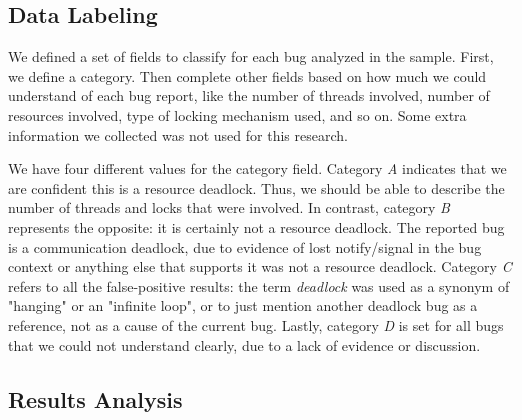 \subsection{Data Labeling}

We defined a set of fields to classify for each bug analyzed in the sample. First, we define a category. Then complete other fields based on how much we could understand of each bug report, like the number of threads involved, number of resources involved, type of locking mechanism used, and so on. Some extra information we collected was not used for this research.

We have four different values for the category field.
Category \emph{A} indicates that  we are confident this is a resource deadlock. Thus, we should be able to describe the number of threads and locks that were involved.
In contrast, category \emph{B} represents the opposite: it is certainly not a resource deadlock. The reported bug is a communication deadlock, due to evidence of lost notify/signal in the bug context or anything else that supports it was not a resource deadlock.
Category \emph{C} refers to all the false-positive results: the term \emph{deadlock} was used as a synonym of "hanging" or an "infinite loop", or to just mention another deadlock bug as a reference, not as a cause of the current bug.
Lastly, category \emph{D} is set for all bugs that we could not understand clearly, due to a lack of evidence or discussion.



\subsection{Results Analysis}

